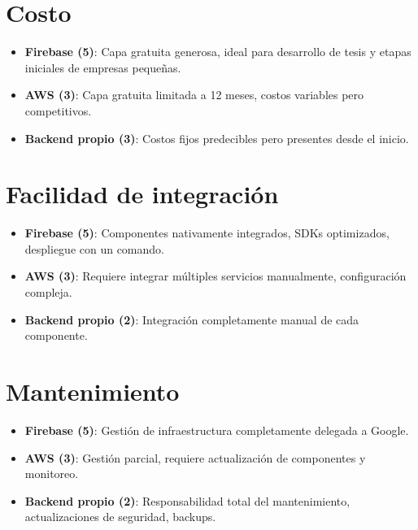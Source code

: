 \section{Costo}

\begin{itemize}
    \item \textbf{Firebase (5)}: Capa gratuita generosa, ideal para desarrollo de tesis y etapas iniciales de empresas pequeñas.
    
    \item \textbf{AWS (3)}: Capa gratuita limitada a 12 meses, costos variables pero competitivos.
    
    \item \textbf{Backend propio (3)}: Costos fijos predecibles pero presentes desde el inicio.
\end{itemize}

\section{Facilidad de integración}

\begin{itemize}
    \item \textbf{Firebase (5)}: Componentes nativamente integrados, SDKs optimizados, despliegue con un comando.
    
    \item \textbf{AWS (3)}: Requiere integrar múltiples servicios manualmente, configuración compleja.
    
    \item \textbf{Backend propio (2)}: Integración completamente manual de cada componente.
\end{itemize}

\section{Mantenimiento}

\begin{itemize}
    \item \textbf{Firebase (5)}: Gestión de infraestructura completamente delegada a Google.
    
    \item \textbf{AWS (3)}: Gestión parcial, requiere actualización de componentes y monitoreo.
    
    \item \textbf{Backend propio (2)}: Responsabilidad total del mantenimiento, actualizaciones de seguridad, backups.
\end{itemize}

